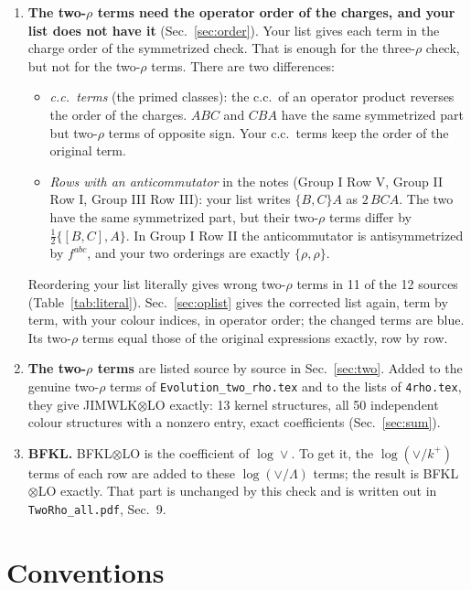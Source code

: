 \documentclass[10pt]{article}
\numberwithin{equation}{section}
\begin{document}
\begin{enumerate}
\item \textbf{The two-$\rho$ terms need the operator order of the charges, and your list does not have it} (Sec.~\ref{sec:order}). Your list gives each term in the charge order of the symmetrized check. That is enough for the three-$\rho$ check, but not for the two-$\rho$ terms. There are two differences:
\begin{itemize}
\item[(a)] \emph{c.c.\ terms} (the primed classes): the c.c.\ of an operator product reverses the order of the charges. $ABC$ and $CBA$ have the same symmetrized part but two-$\rho$ terms of opposite sign. Your c.c.\ terms keep the order of the original term.
\item[(b)] \emph{Rows with an anticommutator} in the notes (Group I Row V, Group II Row I, Group III Row III): your list writes $\{B,C\}A$ as $2\,BCA$. The two have the same symmetrized part, but their two-$\rho$ terms differ by $\tfrac12\{[B,C],A\}$. In Group I Row II the anticommutator is antisymmetrized by $f^{abc}$, and your two orderings are exactly $\{\rho,\rho\}$.
\end{itemize}
Reordering your list literally gives wrong two-$\rho$ terms in 11 of the 12 sources (Table~\ref{tab:literal}). Sec.~\ref{sec:oplist} gives the corrected list again, term by term, with your colour indices, in operator order; the changed terms are blue. Its two-$\rho$ terms equal those of the original expressions exactly, row by row.
\item \textbf{The two-$\rho$ terms} are listed source by source in Sec.~\ref{sec:two}. Added to the genuine two-$\rho$ terms of \texttt{Evolution\_two\_rho.tex} and to the lists of \texttt{4rho.tex}, they give JIMWLK$\otimes$LO exactly: 13 kernel structures, all 50 independent colour structures with a nonzero entry, exact coefficients (Sec.~\ref{sec:sum}).
\item \textbf{BFKL.} BFKL$\otimes$LO is the coefficient of $\log\vee$. To get it, the $\log(\vee/k^+)$ terms of each row are added to these $\log(\vee/\Lambda)$ terms; the result is BFKL$\otimes$LO exactly. That part is unchanged by this check and is written out in \texttt{TwoRho\_all.pdf}, Sec.~9.
\end{enumerate}

\section{Conventions}\label{sec:conv}
\end{document}
